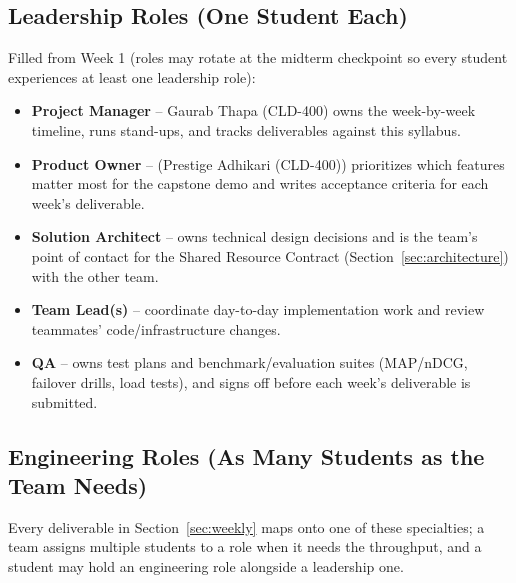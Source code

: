 \documentclass[10pt, a4paper]{article}
\begin{document}
\subsection*{Leadership Roles (One Student Each)}
Filled from Week 1 (roles may rotate at the midterm checkpoint so every student experiences at least one leadership role):
\begin{itemize}
    \item \textbf{Project Manager} -- Gaurab Thapa (CLD-400) owns the week-by-week timeline, runs stand-ups, and tracks deliverables against this syllabus.
    \item \textbf{Product Owner} -- (Prestige Adhikari (CLD-400)) prioritizes which features matter most for the capstone demo and writes acceptance criteria for each week's deliverable.
    \item \textbf{Solution Architect} -- owns technical design decisions and is the team's point of contact for the Shared Resource Contract (Section~\ref{sec:architecture}) with the other team.
    \item \textbf{Team Lead(s)} -- coordinate day-to-day implementation work and review teammates' code/infrastructure changes.
    \item \textbf{QA} -- owns test plans and benchmark/evaluation suites (MAP/nDCG, failover drills, load tests), and signs off before each week's deliverable is submitted.
\end{itemize}

\subsection*{Engineering Roles (As Many Students as the Team Needs)}
Every deliverable in Section~\ref{sec:weekly} maps onto one of these specialties; a team assigns multiple students to a role when it needs the throughput, and a student may hold an engineering role alongside a leadership one.
\end{document}

